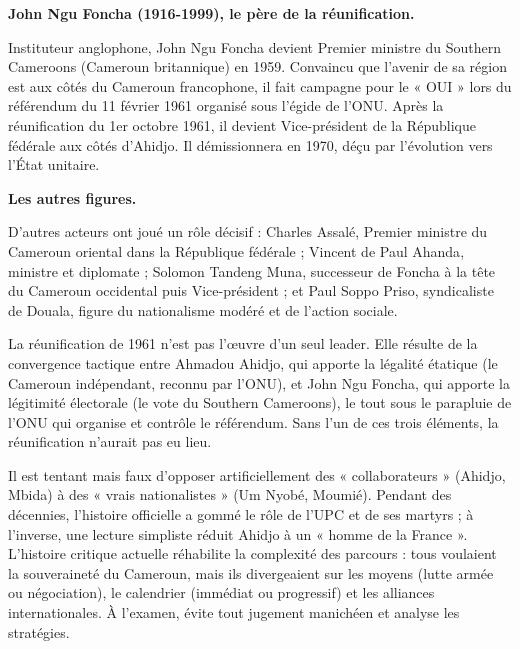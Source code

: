 \documentclass[11pt]{article}
\newcommand{\cle}[1]{{\popxbold\color{popdark}#1}}
\begin{document}
\textbf{John Ngu Foncha (1916-1999), le père de la réunification.}\par
Instituteur anglophone, John Ngu Foncha devient Premier ministre du \cle{Southern Cameroons} (Cameroun britannique) en 1959. Convaincu que l'avenir de sa région est aux côtés du Cameroun francophone, il fait campagne pour le « OUI » lors du \cle{référendum du 11 février 1961} organisé sous l'égide de l'ONU. Après la réunification du 1er octobre 1961, il devient \cle{Vice-président} de la République fédérale aux côtés d'Ahidjo. Il démissionnera en 1970, déçu par l'évolution vers l'État unitaire.

\textbf{Les autres figures.}\par
D'autres acteurs ont joué un rôle décisif : \cle{Charles Assalé}, Premier ministre du Cameroun oriental dans la République fédérale ; \cle{Vincent de Paul Ahanda}, ministre et diplomate ; \cle{Solomon Tandeng Muna}, successeur de Foncha à la tête du Cameroun occidental puis Vice-président ; et \cle{Paul Soppo Priso}, syndicaliste de Douala, figure du nationalisme modéré et de l'action sociale.

\begin{propriete}
La réunification de 1961 n'est pas l'œuvre d'un seul leader. Elle résulte de la \cle{convergence tactique} entre Ahmadou Ahidjo, qui apporte la \cle{légalité étatique} (le Cameroun indépendant, reconnu par l'ONU), et John Ngu Foncha, qui apporte la \cle{légitimité électorale} (le vote du Southern Cameroons), le tout sous le parapluie de l'ONU qui organise et contrôle le référendum. Sans l'un de ces trois éléments, la réunification n'aurait pas eu lieu.
\end{propriete}

\begin{attention}
Il est tentant mais faux d'opposer artificiellement des « collaborateurs » (Ahidjo, Mbida) à des « vrais nationalistes » (Um Nyobé, Moumié). Pendant des décennies, l'histoire officielle a gommé le rôle de l'UPC et de ses martyrs ; à l'inverse, une lecture simpliste réduit Ahidjo à un « homme de la France ». L'histoire critique actuelle réhabilite la \cle{complexité des parcours} : tous voulaient la souveraineté du Cameroun, mais ils divergeaient sur les \cle{moyens} (lutte armée ou négociation), le \cle{calendrier} (immédiat ou progressif) et les \cle{alliances} internationales. À l'examen, évite tout jugement manichéen et analyse les stratégies.
\end{attention}
\end{document}

